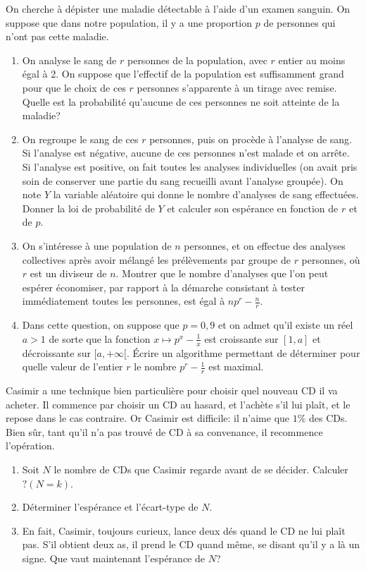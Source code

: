 \documentclass{book}
\begin{document}
\begin{Exercice}
On cherche à dépister une maladie détectable à l'aide d'un examen sanguin. On suppose que dans notre population, il y a une proportion $p$ de personnes qui n'ont pas cette maladie.
\begin{enumerate}
\item On analyse le sang de $r$ personnes de la population, avec $r$ entier au moins égal à 2. On suppose que l'effectif de la population est suffisamment grand pour que le choix de ces $r$ personnes s'apparente à un tirage avec remise. Quelle est la probabilité qu'aucune de ces personnes ne soit atteinte de la maladie?
\item On regroupe le sang de ces $r$ personnes, puis on procède à l'analyse de sang. Si l'analyse est négative, aucune de ces personnes n'est malade et on arrête. Si l'analyse est positive, on fait toutes les analyses individuelles (on avait pris soin de conserver une partie du sang recueilli avant l'analyse groupée). On note $Y$ la variable aléatoire qui donne le nombre d'analyses de sang effectuées. Donner la loi de probabilité de $Y$ et calculer son espérance en fonction de $r$ et de $p$.
\item On s'intéresse à une population de $n$ personnes, et on effectue des analyses collectives après avoir mélangé les prélèvements par groupe de $r$ personnes, où $r$ est un diviseur de $n$. Montrer que le nombre d'analyses que l'on peut espérer économiser, par rapport à la démarche consistant à tester immédiatement toutes les personnes, est égal à $np^r-\frac nr$.
\item Dans cette question, on suppose que $p=0,9$ et on admet qu'il existe un réel $a>1$ de sorte que la fonction $x\mapsto p^x-\frac{1}x$ est croissante sur $[1,a]$ et décroissante sur $[a,+\infty[$. \'Ecrire un algorithme permettant de déterminer 
pour quelle valeur de l'entier $r$ le nombre $p^r-\frac 1r$ est maximal.
\end{enumerate} 
\end{Exercice}

\begin{Exercice}[Choix de CD]
Casimir a une technique bien particulière pour choisir quel nouveau CD il va acheter.
Il commence par choisir un CD au hasard, et l'achète s'il lui plaît,
et le repose dans le cas contraire.
Or Casimir est difficile: il n'aime que $1\%$ des CDs.
Bien sûr, tant qu'il n'a pas trouvé de CD à sa convenance, il recommence l'opération.
\begin{enumerate}
\item
  Soit $N$ le nombre de CDs que Casimir regarde avant de se décider.
  Calculer $?(N=k)$.
\item
  Déterminer l'espérance et l'écart-type de $N$.
\item
  En fait, Casimir, toujours curieux, lance deux dés quand le CD ne lui plaît pas.
  S'il obtient deux as, il prend le CD quand même, se disant qu'il y a là
  un signe. Que vaut maintenant l'espérance de $N$?
\end{enumerate}
\end{Exercice}
\end{document}
